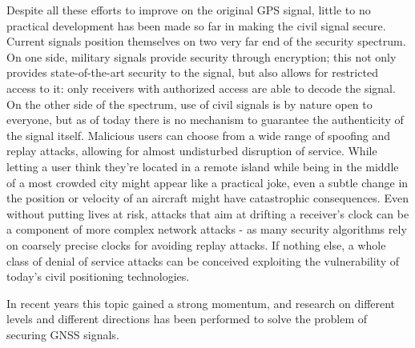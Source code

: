 Despite all these efforts to improve on the original GPS signal, little to no
practical development has been made so far in making the civil signal secure.
Current signals position themselves on two very far end of the security
spectrum. On one side, military signals provide security through encryption;
this not only provides state-of-the-art security to the signal, but also allows
for restricted access to it: only receivers with authorized access are able to
decode the signal. On the other side of the spectrum, use of civil signals is by
nature open to everyone, but as of today there is no mechanism to guarantee the
authenticity of the signal itself. Malicious users can choose from a wide range
of spoofing and replay attacks, allowing for almost undisturbed disruption of
service. While letting a user think they're located in a remote island while
being in the middle of a most crowded city might appear like a practical joke,
even a subtle change in the position or velocity of an aircraft might have
catastrophic consequences. Even without putting lives at risk, attacks that aim
at drifting a receiver's clock can be a component of more complex network
attacks - as many security algorithms rely on coarsely precise clocks for
avoiding replay attacks. If nothing else, a whole class of denial of service
attacks can be conceived exploiting the vulnerability of today's civil
positioning technologies.

In recent years this topic gained a strong momentum, and research on different
levels and different directions has been performed to solve the problem of
securing GNSS signals.

